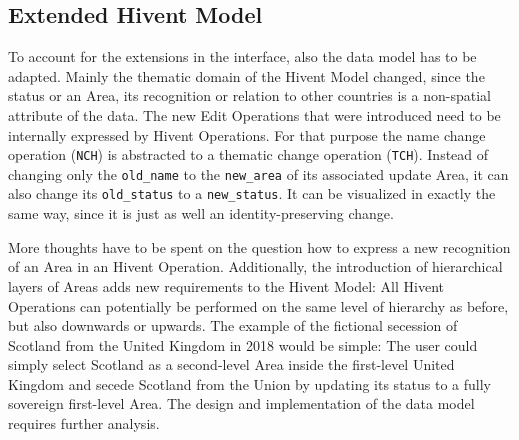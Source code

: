 


\subsection{Extended Hivent Model} %
\label{sub:extended_hivent_model}

To account for the extensions in the interface, also the data model has to be adapted. Mainly the thematic domain of the Hivent Model changed, since the status or an Area, its recognition or relation to other countries is a non-spatial attribute of the data. The new Edit Operations that were introduced need to be internally  expressed by Hivent Operations. For that purpose the name change operation (\texttt{NCH}) is abstracted to a thematic change operation (\texttt{TCH}). Instead of changing only the \texttt{old\_name} to the \texttt{new\_area} of its associated update Area, it can also change its \texttt{old\_status} to a \texttt{new\_status}. It can be visualized in exactly the same way, since it is just as well an identity-preserving change.

More thoughts have to be spent on the question how to express a new recognition of an Area in an Hivent Operation. Additionally, the introduction of hierarchical layers of Areas adds new requirements to the Hivent Model: All Hivent Operations can potentially be performed on the same level of hierarchy as before, but also downwards or upwards. The example of the fictional secession of Scotland from the United Kingdom in 2018 would be simple: The user could simply select Scotland as a second-level Area inside the first-level United Kingdom and secede Scotland from the Union by updating its status to a fully sovereign first-level Area. The design and implementation of the data model requires further analysis.

